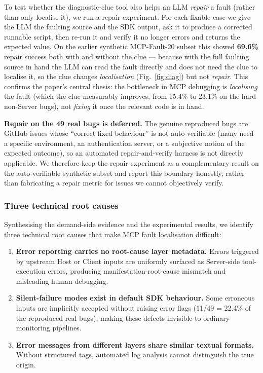 To test whether the diagnostic-clue tool also helps an LLM \emph{repair} a fault (rather than only
localise it), we run a repair experiment. For each fixable case we give the LLM the faulting
source and the SDK output, ask it to produce a corrected runnable script, then re-run it and
verify it no longer errors and returns the expected value. On the earlier
synthetic MCP-Fault-20 subset this showed \textbf{69.6\%} repair success both with and without the
clue --- because with the full faulting source in hand the LLM can read the fault directly and
does not need the clue to localise it, so the clue changes \emph{localisation}
(Fig.~\ref{fig:diag}) but not \emph{repair}. This confirms the paper's central thesis: the
bottleneck in MCP debugging is \emph{localising} the fault (which the clue measurably improves,
from 15.4\% to 23.1\% on the hard non-Server bugs), not \emph{fixing} it once the relevant
code is in hand.

\textbf{Repair on the 49 real bugs is deferred.} The genuine reproduced bugs are
GitHub issues whose ``correct fixed behaviour'' is not auto-verifiable (many need a specific
environment, an authentication server, or a subjective notion of the expected outcome), so an
automated repair-and-verify harness is not directly applicable. We therefore keep the repair
experiment as a complementary result on the auto-verifiable synthetic subset and report this
boundary honestly, rather than fabricating a repair metric for issues we cannot objectively
verify.

\subsubsection{Three technical root causes}

Synthesising the demand-side evidence and the experimental results, we identify three
technical root causes that make MCP fault localisation difficult:
\begin{enumerate}
  \item \textbf{Error reporting carries no root-cause layer metadata.} Errors triggered by
        upstream Host or Client inputs are uniformly surfaced as Server-side tool-execution
        errors, producing manifestation-root-cause mismatch and misleading human debugging.
  \item \textbf{Silent-failure modes exist in default SDK behaviour.} Some erroneous inputs
        are implicitly accepted without raising error flags (11/49 = 22.4\% of the reproduced
        real bugs), making these defects invisible to ordinary monitoring pipelines.
  \item \textbf{Error messages from different layers share similar textual formats.} Without
        structured tags, automated log analysis cannot distinguish the true origin.
\end{enumerate}

